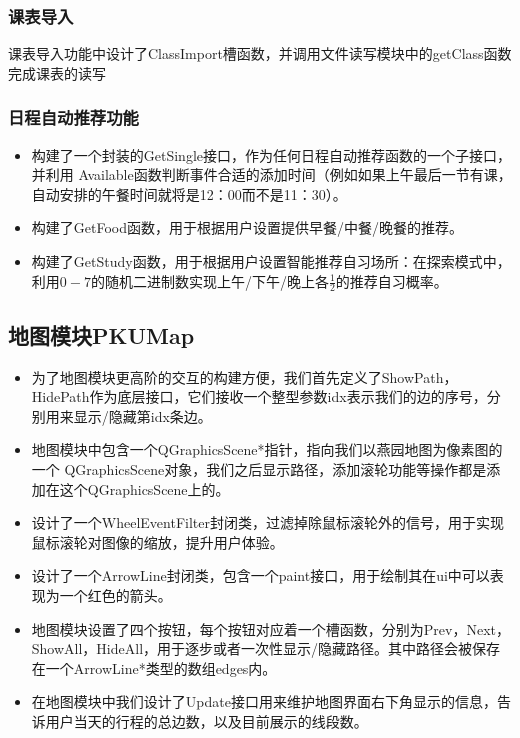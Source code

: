 \documentclass[11pt,hyperref,a4paper,UTF8]{ctexart}
\begin{document}
\begin{CJK}{UTF8}{gkai}
\subsubsection{课表导入}
课表导入功能中设计了ClassImport槽函数，并调用文件读写模块中的getClass函数完成课表的读写

\subsubsection{日程自动推荐功能}
\begin{itemize}
    \item 构建了一个封装的GetSingle接口，作为任何日程自动推荐函数的一个子接口，并利用 Available函数判断事件合适的添加时间（例如如果上午最后一节有课，自动安排的午餐时间就将是12：00而不是11：30）。
    \item 构建了GetFood函数，用于根据用户设置提供早餐/中餐/晚餐的推荐。
    \item 构建了GetStudy函数，用于根据用户设置智能推荐自习场所：在探索模式中，利用$0-7$的随机二进制数实现上午/下午/晚上各$\frac{1}{2}$的推荐自习概率。
    \label{Recom}
\end{itemize}
\subsection{地图模块PKUMap}
\begin{itemize}
    \item 为了地图模块更高阶的交互的构建方便，我们首先定义了ShowPath，HidePath作为底层接口，它们接收一个整型参数idx表示我们的边的序号，分别用来显示/隐藏第idx条边。
    \item 地图模块中包含一个QGraphicsScene*指针，指向我们以燕园地图为像素图的一个 QGraphicsScene对象，我们之后显示路径，添加滚轮功能等操作都是添加在这个QGraphicsScene上的。
    \item 设计了一个WheelEventFilter封闭类，过滤掉除鼠标滚轮外的信号，用于实现鼠标滚轮对图像的缩放，提升用户体验。
    \item 设计了一个ArrowLine封闭类，包含一个paint接口，用于绘制其在ui中可以表现为一个红色的箭头。
    \item 地图模块设置了四个按钮，每个按钮对应着一个槽函数，分别为Prev，Next，ShowAll，HideAll，用于逐步或者一次性显示/隐藏路径。其中路径会被保存在一个ArrowLine*类型的数组edges内。
    \item 在地图模块中我们设计了Update接口用来维护地图界面右下角显示的信息，告诉用户当天的行程的总边数，以及目前展示的线段数。
\end{itemize}


\end{CJK}
\end{document}
